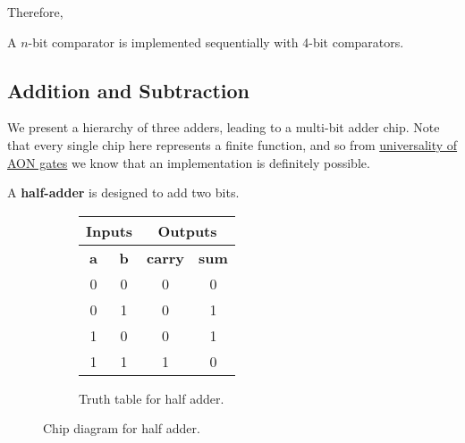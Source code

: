   Therefore, 

  \begin{definition}
    A $n$-bit comparator is implemented sequentially with 4-bit comparators. 
  \end{definition}

\subsection{Addition and Subtraction} 

  We present a hierarchy of three adders, leading to a multi-bit adder chip. Note that every single chip here represents a finite function, and so from  \hyperref[th-thm:aon_univ]{universality of AON gates} we know that an implementation is definitely possible. 
  
  \begin{definition} 
    A \textbf{half-adder} is designed to add two bits. 

    \begin{figure}[H]
      \centering
      \begin{subfigure}[b]{0.48\textwidth}
        \centering
        \begin{tabular}{|c|c||c|c|}
          \hline
          \multicolumn{2}{|c||}{\textbf{Inputs}} & \multicolumn{2}{c|}{\textbf{Outputs}} \\
          \hline
          \textbf{a} & \textbf{b} & \textbf{carry} & \textbf{sum} \\
          \hline
          0 & 0 & 0 & 0 \\
          \hline
          0 & 1 & 0 & 1 \\
          \hline
          1 & 0 & 0 & 1 \\
          \hline
          1 & 1 & 1 & 0 \\
          \hline
        \end{tabular}
        \caption{Truth table for half adder.}
      \end{subfigure}
      \hfill 
      \begin{subfigure}[b]{0.48\textwidth}
        \centering
        \caption{}
      \end{subfigure}
      \caption{Chip diagram for half adder.}
    \end{figure}
  \end{definition}

